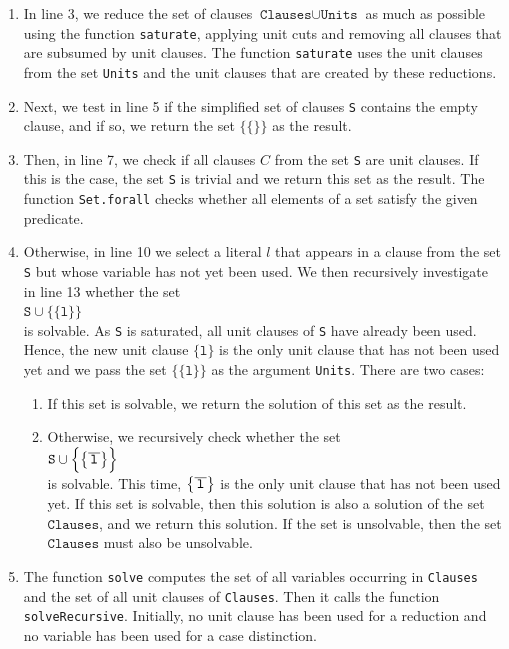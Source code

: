 \begin{enumerate}
\item In line 3, we reduce the set of clauses $\texttt{Clauses} \cup \texttt{Units}$ as much as possible using the
      function \texttt{saturate}, applying unit cuts and removing all clauses that are subsumed by unit clauses.
      The function \texttt{saturate} uses the unit clauses from the set \texttt{Units} and the unit clauses that
      are created by these reductions.
\item Next, we test in line 5 if the simplified set of clauses \texttt{S}
      contains the empty clause, and if so, we return the set
      $\bigl\{\{\}\bigr\}$ as the result.
\item Then, in line 7, we check if all clauses $C$ from the set
      \texttt{S} are unit clauses. If this is the case,
      the set \texttt{S} is trivial and we return this set as the result.  The function \texttt{Set.forall}
      checks whether all elements of a set satisfy the given predicate.
\item Otherwise, in line 10 we select a literal $l$ that appears in a clause from the set \texttt{S}
      but whose variable has not yet been used.
      We then recursively investigate in line 13 whether the set \\[0.2cm]
      \hspace*{1.3cm} 
      $\texttt{S} \cup \bigl\{\{\texttt{l}\}\bigr\}$ 
      \\[0.2cm]
      is solvable.  As \texttt{S} is saturated, all unit clauses of \texttt{S} have already been used.  Hence,
      the new unit clause $\{\texttt{l}\}$ is the only unit clause that has not been used yet and we pass the
      set $\bigl\{\{\texttt{l}\}\bigr\}$ as the argument \texttt{Units}.  There are two cases:
      \begin{enumerate}
      \item If this set is solvable, we return the solution of this set as the result.

      \item Otherwise, we recursively check whether the set 
            \\[0.2cm]
            \hspace*{1.3cm}
            $\texttt{S} \cup \Bigl\{ \bigl\{ \overline{\,\texttt{l}\,} \bigr\} \Bigr\}$
            \\[0.2cm]
            is solvable.  This time, $\bigl\{\overline{\,\texttt{l}\,}\bigr\}$ is the only unit clause that has not
            been used yet.  If this set is solvable, then this solution is also a
            solution of the set $\texttt{Clauses}$, and we return this solution. If the
            set is unsolvable, then the set $\texttt{Clauses}$ must also be unsolvable.
      \end{enumerate}
\item The function \texttt{solve} computes the set of all variables occurring in \texttt{Clauses} and the set of
      all unit clauses of \texttt{Clauses}.  Then it calls the function \texttt{solveRecursive}.  Initially, no
      unit clause has been used for a reduction and no variable has been used for a case distinction.
\end{enumerate}

